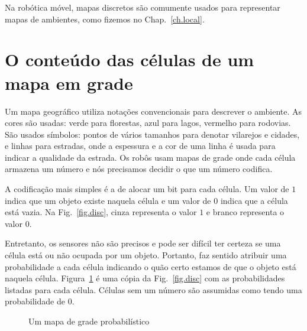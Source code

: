 Na robótica móvel, mapas discretos são comumente usados para representar mapas de ambientes, como fizemos no Chap.~\ref{ch.local}.

\section{O conteúdo das células de um mapa em grade}\label{s.grids}

Um mapa geográfico utiliza notações convencionais para descrever o ambiente. As cores são usadas: verde para florestas, azul para lagos, vermelho para rodovias. São usados símbolos: pontos de vários tamanhos para denotar vilarejos e cidades, e linhas para estradas, onde a espessura e a cor de uma linha é usada para indicar a qualidade da estrada. Os robôs usam mapas de grade onde cada célula armazena um número e nós precisamos decidir o que um número codifica.

A codificação mais simples é a de alocar um bit para cada célula. Um valor de $1$ indica que um objeto existe naquela célula e um valor de $0$ indica que a célula está vazia. Na Fig.~\ref{fig.disc}, cinza representa o valor $1$ e branco representa o valor $0$.

Entretanto, os sensores não são precisos e pode ser difícil ter certeza se uma célula está ou não ocupada por um objeto. Portanto, faz sentido atribuir uma probabilidade a cada célula indicando o quão certo estamos de que o objeto está naquela célula. Figura~\ref{fig.prob-grid} é uma cópia da Fig.~\ref{fig.disc} com as probabilidades listadas para cada célula. Células sem um número são assumidas como tendo uma probabilidade de $0$.

\begin{figure}
\begin{center}
\caption{Um mapa de grade probabilístico}\label{fig.prob-grid}
\end{center}
\end{figure}

